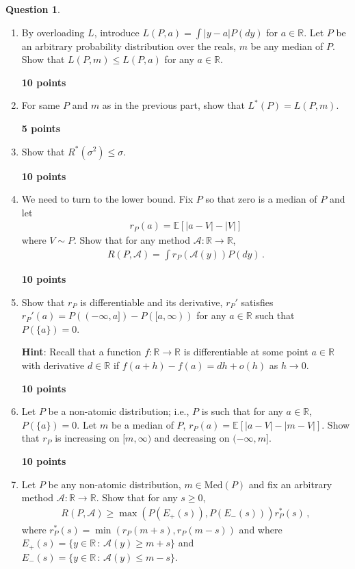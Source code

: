 \documentclass{article}
\newcommand{\R}{\mathbb{R}}
\DeclareMathOperator*{\1}{\mathbbm{1}}
\newcommand{\E}{\mathbb E}
\newcommand{\EE}[1]{\E[#1]}
\newcounter{DocPoints}
\newcounter{QuestionPoints}
\newcommand{\points}[1]{	\par\mbox{}\par\noindent\hfill {\bf #1 points}	\addtocounter{DocPoints}{#1}
	\addtocounter{QuestionPoints}{#1}
}
\theoremstyle{definition}
\newtheorem{question}{Question}
\theoremstyle{remark}
\newcommand{\hint}{\noindent \textbf{Hint}:\xspace}
\newcommand{\cA}{\mathcal{A}}
\begin{document}
\begin{question}
\begin{enumerate}[(Q1)]
\points{10}

\item By overloading $L$, introduce $L(P,a) = \int |y-a| P(dy)$ for $a\in \R$. Let $P$ be an arbitrary probability distribution over the reals, $m$ be any median of $P$. Show that 
$L(P,m)\le L(P,a)$ for any $a\in \R$.

\points{10}
\item For same $P$ and $m$ as in the previous part,
show that $L^*(P)=L(P,m)$.

\points{5}

\item Show that $R^*(\sigma^2) \le \sigma$.
\points{10}

\item We need to turn to the lower bound. 
Fix  $P$ so that zero is a median of $P$ and let
\begin{align*}
r_P(a) = \EE{|a-V|-|V|}
\end{align*}
where $V\sim P$.
Show that for any method $\cA:\R \to \R$,
\begin{align}\label{eq:riskexp}
R(P,\cA) = \int r_P(\cA(y)) P(dy) \,.
\end{align}

\points{10}
\item Show that $r_P$ is differentiable and its derivative, $r_P'$ satisfies $r_P'(a) = P((-\infty,a])-P([a,\infty))$ for any $a\in \R$ such that $P(\{a\})= 0$.

\hint Recall that a function $f:\R \to \R$ is differentiable at some point $a\in \R$ with derivative $d\in \R$ if $f(a+h) - f(a) = d h + o(h)$ as $h\to 0$.

\points{10}

\item Let $P$ be a non-atomic distribution; i.e., $P$ is such that for any $a\in \R$, $P(\{a\}) = 0$.
Let $m$ be a median of $P$, $r_P(a) = \EE{ |a-V|-|m-V|}$.
Show that $r_P$ is increasing on $[m,\infty)$ and decreasing on $(-\infty,m]$.

\points{10}

\item \label{p:risk2prob}

Let  $P $ be any non-atomic distribution, $m\in \text{Med}(P)$ and fix an arbitrary method $\cA:\R \to \R$. Show that for any $s\ge 0$,
\begin{align}\label{eq:risklblap}
R(P,\cA) \ge  \max( P(E_+(s)),P(E_-(s))) r^*_P(s)\,,
\end{align}
where $r^*_P(s) = \min(r_P(m+s),r_P(m-s))$ and
where $E_+(s) = \{y\in \R\,:\, \cA(y)\ge m+ s\}$
and $E_-(s) = \{y\in \R\,:\, \cA(y)\le m- s\}$.


\end{enumerate}
\end{question}
\end{document}
